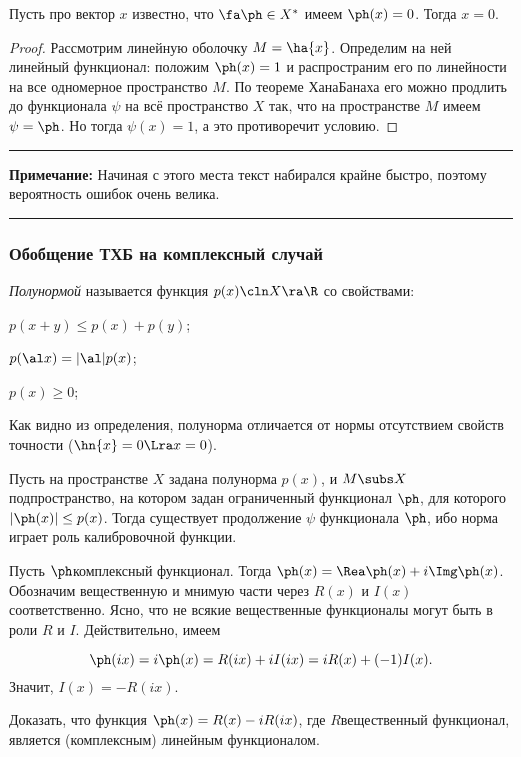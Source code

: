 \documentclass[a4paper]{article}
\newcommand{\comment}[1]{\par\vskip2pt\hrule\vskip2pt{\footnotesize \textbf{Примечание:} #1\par}\vskip2pt\hrule\vskip2pt}
\begin{document}
\begin{imp}\label{imp:about.zero.vector}
Пусть про вектор $x$ известно, что $\fa \ph \in X^*$ имеем $\ph(x) = 0$. Тогда $x = 0$.
\end{imp}
\begin{proof}
Рассмотрим линейную оболочку $M = \ha{x}$.  Определим на ней линейный функционал:
положим $\ph(x) = 1$ и распространим его по линейности на все одномерное пространство $M$.
По теореме Хана\ч Банаха его можно продлить до функционала $\psi$ на всё пространство $X$ так, что
на пространстве $M$ имеем $\psi = \ph$. Но тогда $\psi(x) = 1$, а это противоречит условию.
\end{proof}


\bigskip
\comment{Начиная с этого места текст набирался крайне быстро, поэтому вероятность ошибок очень велика.}
\bigskip

\subsubsection{Обобщение ТХБ на комплексный случай}

\begin{df}
\emph{Полунормой} называется функция $p(x)\cln X\ra \R$ со свойствами:
\begin{items}{-2}
\item $p(x+y)\le p(x)+p(y)$;
\item $p(\al x) = |\al|p(x)$;
\item $p(x)\ge 0$;
\end{items}
\end{df}

Как видно из определения, полунорма отличается от нормы отсутствием свойств точности ($\hn{x}=0\Lra x=0$).

Пусть на пространстве $X$ задана полунорма $p(x)$, и $M\subs X$\т подпространство, на котором задан
ограниченный функционал $\ph$, для которого $|\ph(x)|\le p(x)$. Тогда существует продолжение $\psi$ функционала $\ph$,
ибо норма играет роль калибровочной функции.

Пусть $\ph$\т комплексный функционал. Тогда $\ph(x) = \Rea \ph(x)+i\Img\ph(x)$. Обозначим вещественную и
мнимую части через $R(x)$ и $I(x)$ соответственно.
Ясно, что не всякие вещественные функционалы могут быть в роли $R$ и $I$. Действительно, имеем

$$\ph(ix) = i\ph(x) = R(ix)+iI(ix) = iR(x)+(-1)I(x).$$
Значит, $I(x) = -R(ix)$.

\begin{problem}
Доказать, что функция $\ph(x)=R(x)-iR(ix)$, где $R$\т вещественный функционал, является (комплексным) линейным
функционалом.
\end{problem}
\end{document}
